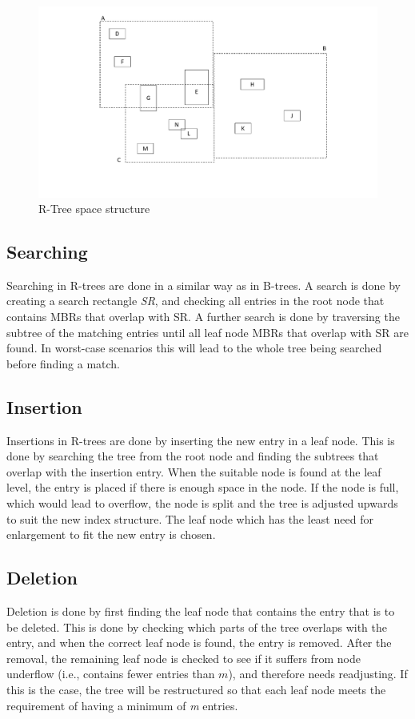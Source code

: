 \begin{figure}[ht]
    \centering
    \includegraphics[scale=0.3]{figures/RTree_space.pdf}
    \caption{R-Tree space structure}
    \label{fig:RtreeSpace}
\end{figure}

\subsection{Searching}
Searching in R-trees are done in a similar way as in B-trees. A search is done by creating a search rectangle \emph{SR}, and checking all entries in the root node that contains MBRs that overlap with SR. A further search is done by traversing the subtree of the matching entries until all leaf node MBRs that overlap with SR are found. In worst-case scenarios this will lead to the whole tree being searched before finding a match. 

\subsection{Insertion}
Insertions in R-trees are done by inserting the new entry in a leaf node. This is done by searching the tree from the root node and finding the subtrees that overlap with the insertion entry. When the suitable node is found at the leaf level, the entry is placed if there is enough space in the node. If the node is full, which would lead to overflow, the node is split and the tree is adjusted upwards to suit the new index structure. The leaf node which has the least need for enlargement to fit the new entry is chosen.

\subsection{Deletion}
Deletion is done by first finding the leaf node that contains the entry that is to be deleted. This is done by checking which parts of the tree overlaps with the entry, and when the correct leaf node is found, the entry is removed. After the removal, the remaining leaf node is checked to see if it suffers from node underflow (i.e., contains fewer entries than $m$), and therefore needs readjusting. If this is the case, the tree will be restructured so that each leaf node meets the requirement of having a minimum of \emph{m} entries. 

